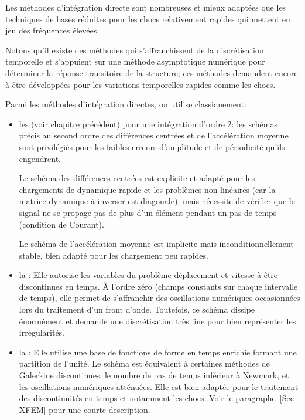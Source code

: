 Les méthodes d'intégration directe sont nombreuses et mieux adaptées que les techniques de bases réduites pour les chocs relativement rapides qui mettent en jeu des fréquences élevées.

Notons qu'il existe des méthodes qui s'affranchissent de la discrétisation temporelle et s'appuient sur une méthode asymptotique numérique pour déterminer la réponse transitoire de la structure; ces méthodes demandent encore à être développées pour les variations temporelles rapides comme les chocs.

Parmi les méthodes d'intégration directes, on utilise classiquement:
\begin{itemize}
	\item les  (voir chapitre précédent) pour une intégration d'ordre 2: 		les schémas précis au second ordre des différences centrées et de l'accélération moyenne sont privilégiés pour les faibles erreurs d'amplitude et de périodicité qu'ils engendrent.
		
		Le schéma des différences centrées
		est explicite et adapté pour les chargements de dynamique rapide et les
		problèmes non linéaires (car la matrice dynamique à inverser est diagonale),
		mais nécessite de vérifier que le signal ne se propage pas de plus d'un élément
		pendant un pas de temps (condition de Courant).
		
		Le schéma de l'accélération moyenne est implicite mais inconditionnellement
		stable, bien adapté pour les chargement peu rapides.
	\item la :
		Elle autorise les variables du problème déplacement et vitesse à être
		discontinues en temps.
		À l'ordre zéro (champs constants sur chaque intervalle de temps), elle permet
		de s'affranchir des oscillations numériques occasionnées lors du traitement
		d'un front d'onde.
		Toutefois, ce schéma dissipe énormément et demande une discrétisation
		très fine pour bien représenter les irrégularités.
	\item la :
		Elle utilise une base de fonctions de forme en temps enrichie formant une partition de l'unité. Le schéma est équivalent à certaines méthodes de Galerkine discontinues, le nombre de pas de temps inférieur à Newmark, et les oscillations numériques atténuées.
		Elle est bien adaptée pour le traitement des discontinuités en temps et
		notamment les chocs. Voir le paragraphe~\ref{Sec-XFEM} pour une courte description.
\end{itemize}

